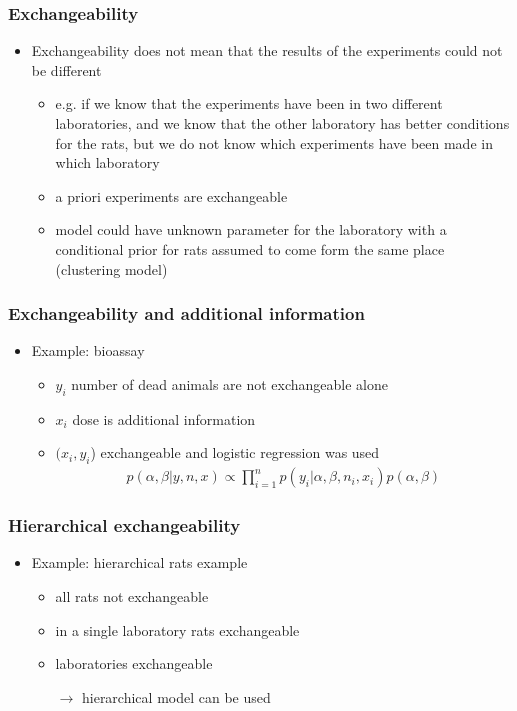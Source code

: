 \documentclass[10pt]{beamer}
\begin{document}
\begin{frame}

\frametitle{Exchangeability}

  \begin{itemize}
  \item Exchangeability does not mean that the results of the
    experiments could not be different
    \begin{itemize}
    \item e.g. if we know that the experiments have been in two
      different laboratories, and we know that the other laboratory
      has better conditions for the rats, but we do not know which
      experiments have been made in which laboratory
    \item a priori experiments are exchangeable
    \item model could have unknown parameter for the laboratory with a
      conditional prior for rats assumed to come form the same place (clustering model)
    \end{itemize}
  \end{itemize}
\end{frame}

\begin{frame}

\frametitle{Exchangeability and additional information}

  \begin{itemize}
  \item Example: bioassay
    \begin{itemize}
      \item<+-> $y_i$ number of dead animals are not exchangeable alone
      \item<+-> $x_i$ dose is additional information
      \item<+-> $(x_i,y_i$) exchangeable and logistic regression was used
    \begin{align*}
      p(\alpha,\beta|y,n,x)\propto \prod_{i=1}^n p(y_i|\alpha,\beta,n_i,x_i)p(\alpha,\beta)
    \end{align*}
    \end{itemize}
  \end{itemize}
\end{frame}

\begin{frame}

\frametitle{Hierarchical exchangeability}

  \begin{itemize}
  \item Example: hierarchical rats example
    \begin{itemize}
    \item<+-> all rats not exchangeable
    \item<+-> in a single laboratory rats exchangeable
    \item<+-> laboratories exchangeable

    \pause

    $\rightarrow$ hierarchical model can be used
    \end{itemize}
  \end{itemize}
\end{frame}
\end{document}
